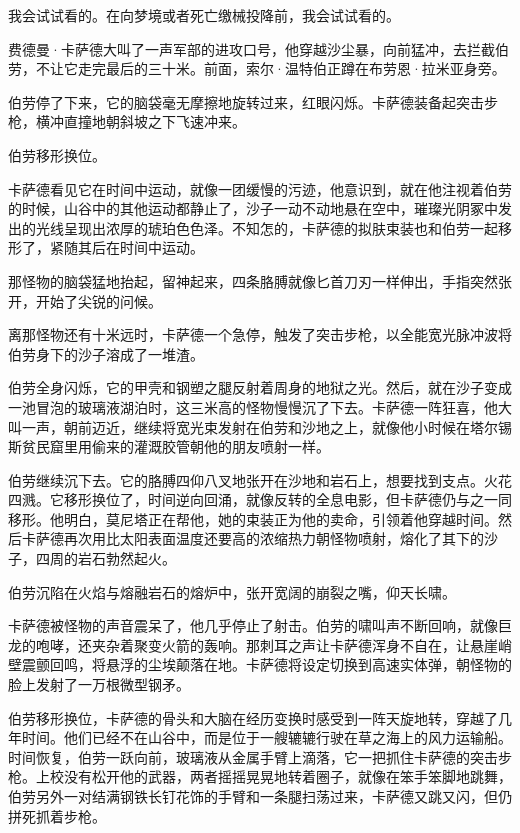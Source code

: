 \documentclass[AutoFakeBold=true]{book}
\begin{document}
我会试试看的。在向梦境或者死亡缴械投降前，我会试试看的。

\vspace*{1em}

费德曼·卡萨德大叫了一声军部的进攻口号，他穿越沙尘暴，向前猛冲，去拦截伯劳，不让它走完最后的三十米。前面，索尔·温特伯正蹲在布劳恩·拉米亚身旁。

伯劳停了下来，它的脑袋毫无摩擦地旋转过来，红眼闪烁。卡萨德装备起突击步枪，横冲直撞地朝斜坡之下飞速冲来。

伯劳移形换位。

卡萨德看见它在时间中运动，就像一团缓慢的污迹，他意识到，就在他注视着伯劳的时候，山谷中的其他运动都静止了，沙子一动不动地悬在空中，璀璨光阴冢中发出的光线呈现出浓厚的琥珀色色泽。不知怎的，卡萨德的拟肤束装也和伯劳一起移形了，紧随其后在时间中运动。

那怪物的脑袋猛地抬起，留神起来，四条胳膊就像匕首刀刃一样伸出，手指突然张开，开始了尖锐的问候。

离那怪物还有十米远时，卡萨德一个急停，触发了突击步枪，以全能宽光脉冲波将伯劳身下的沙子溶成了一堆渣。

伯劳全身闪烁，它的甲壳和钢塑之腿反射着周身的地狱之光。然后，就在沙子变成一池冒泡的玻璃液湖泊时，这三米高的怪物慢慢沉了下去。卡萨德一阵狂喜，他大叫一声，朝前迈近，继续将宽光束发射在伯劳和沙地之上，就像他小时候在塔尔锡斯贫民窟里用偷来的灌溉胶管朝他的朋友喷射一样。

伯劳继续沉下去。它的胳膊四仰八叉地张开在沙地和岩石上，想要找到支点。火花四溅。它移形换位了，时间逆向回涌，就像反转的全息电影，但卡萨德仍与之一同移形。他明白，莫尼塔正在帮他，她的束装正为他的卖命，引领着他穿越时间。然后卡萨德再次用比太阳表面温度还要高的浓缩热力朝怪物喷射，熔化了其下的沙子，四周的岩石勃然起火。

伯劳沉陷在火焰与熔融岩石的熔炉中，张开宽阔的崩裂之嘴，仰天长啸。

卡萨德被怪物的声音震呆了，他几乎停止了射击。伯劳的啸叫声不断回响，就像巨龙的咆哮，还夹杂着聚变火箭的轰响。那刺耳之声让卡萨德浑身不自在，让悬崖峭壁震颤回鸣，将悬浮的尘埃颠落在地。卡萨德将设定切换到高速实体弹，朝怪物的脸上发射了一万根微型钢矛。

伯劳移形换位，卡萨德的骨头和大脑在经历变换时感受到一阵天旋地转，穿越了几年时间。他们已经不在山谷中，而是位于一艘辘辘行驶在草之海上的风力运输船。时间恢复，伯劳一跃向前，玻璃液从金属手臂上滴落，它一把抓住卡萨德的突击步枪。上校没有松开他的武器，两者摇摇晃晃地转着圈子，就像在笨手笨脚地跳舞，伯劳另外一对结满钢铁长钉花饰的手臂和一条腿扫荡过来，卡萨德又跳又闪，但仍拼死抓着步枪。
\end{document}

